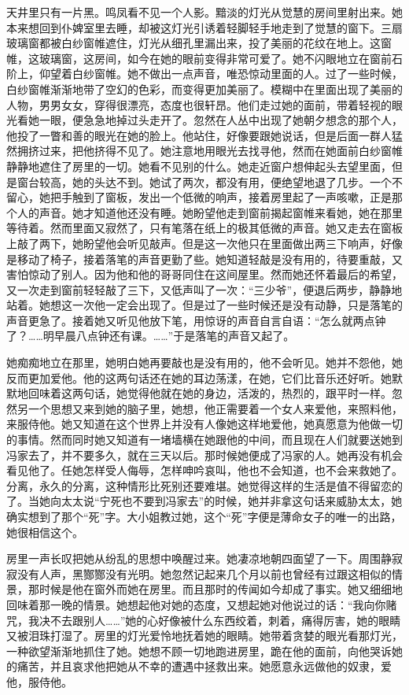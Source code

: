 \par 天井里只有一片黑。鸣凤看不见一个人影。黯淡的灯光从觉慧的房间里射出来。她本来想回到仆婢室里去睡，却被这灯光引诱着轻脚轻手地走到了觉慧的窗下。三扇玻璃窗都被白纱窗帷遮住，灯光从细孔里漏出来，投了美丽的花纹在地上。这窗帷，这玻璃窗，这房间，如今在她的眼前变得非常可爱了。她不闪眼地立在窗前石阶上，仰望着白纱窗帷。她不做出一点声音，唯恐惊动里面的人。过了一些时候，白纱窗帷渐渐地带了空幻的色彩，而变得更加美丽了。模糊中在里面出现了美丽的人物，男男女女，穿得很漂亮，态度也很轩昂。他们走过她的面前，带着轻视的眼光看她一眼，便急急地掉过头走开了。忽然在人丛中出现了她朝夕想念的那个人，他投了一瞥和善的眼光在她的脸上。他站住，好像要跟她说话，但是后面一群人猛然拥挤过来，把他挤得不见了。她注意地用眼光去找寻他，然而在她面前白纱窗帷静静地遮住了房里的一切。她看不见别的什么。她走近窗户想伸起头去望里面，但是窗台较高，她的头达不到。她试了两次，都没有用，便绝望地退了几步。一个不留心，她把手触到了窗板，发出一个低微的响声，接着房里起了一声咳嗽，正是那个人的声音。她才知道他还没有睡。她盼望他走到窗前揭起窗帷来看她，她在那里等待着。然而里面又寂然了，只有笔落在纸上的极其低微的声音。她又走去在窗板上敲了两下，她盼望他会听见敲声。但是这一次他只在里面做出两三下响声，好像是移动了椅子，接着落笔的声音更勤了些。她知道轻敲是没有用的，待要重敲，又害怕惊动了别人。因为他和他的哥哥同住在这间屋里。然而她还怀着最后的希望，又一次走到窗前轻轻敲了三下，又低声叫了一次：“三少爷”，便退后两步，静静地站着。她想这一次他一定会出现了。但是过了一些时候还是没有动静，只是落笔的声音更急了。接着她又听见他放下笔，用惊讶的声音自言自语：“怎么就两点钟了？……明早晨八点钟还有课。……”于是落笔的声音又起了。
\par 她痴痴地立在那里，她明白她再要敲也是没有用的，他不会听见。她并不怨他，她反而更加爱他。他的这两句话还在她的耳边荡漾，在她，它们比音乐还好听。她默默地回味着这两句话，她觉得他就在她的身边，活泼的，热烈的，跟平时一样。忽然另一个思想又来到她的脑子里，她想，他正需要着一个女人来爱他，来照料他，来服侍他。她又知道在这个世界上并没有人像她这样地爱他，她真愿意为他做一切的事情。然而同时她又知道有一堵墙横在她跟他的中间，而且现在人们就要送她到冯家去了，并不要多久，就在三天以后。那时候她便成了冯家的人。她再没有机会看见他了。任她怎样受人侮辱，怎样呻吟哀叫，他也不会知道，也不会来救她了。分离，永久的分离，这种情形比死别还要难堪。她觉得这样的生活是值不得留恋的了。当她向太太说“宁死也不要到冯家去”的时候，她并非拿这句话来威胁太太，她确实想到了那个“死”字。大小姐教过她，这个“死”字便是薄命女子的唯一的出路，她很相信这个。
\par 房里一声长叹把她从纷乱的思想中唤醒过来。她凄凉地朝四面望了一下。周围静寂寂没有人声，黑酂酂没有光明。她忽然记起来几个月以前也曾经有过跟这相似的情景，那时候是他在窗外而她在房里。而且那时的传闻如今却成了事实。她又细细地回味着那一晚的情景。她想起他对她的态度，又想起她对他说过的话：“我向你赌咒，我决不去跟别人……”她的心好像被什么东西绞着，刺着，痛得厉害，她的眼睛又被泪珠打湿了。房里的灯光爱怜地抚着她的眼睛。她带着贪婪的眼光看那灯光，一种欲望渐渐地抓住了她。她想不顾一切地跑进房里，跪在他的面前，向他哭诉她的痛苦，并且哀求他把她从不幸的遭遇中拯救出来。她愿意永远做他的奴隶，爱他，服侍他。
